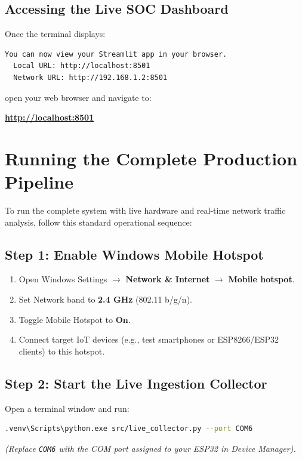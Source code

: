 \documentclass[11pt,a4paper]{article}
\begin{document}
\subsection{Accessing the Live SOC Dashboard}
Once the terminal displays:
\begin{lstlisting}[numbers=none]
  You can now view your Streamlit app in your browser.
  Local URL: http://localhost:8501
  Network URL: http://192.168.1.2:8501
\end{lstlisting}
open your web browser and navigate to:
\begin{center}
\textbf{\url{http://localhost:8501}}
\end{center}

\section{Running the Complete Production Pipeline}

To run the complete system with live hardware and real-time network traffic analysis, follow this standard operational sequence:

\subsection{Step 1: Enable Windows Mobile Hotspot}
\begin{enumerate}[noitemsep]
    \item Open Windows Settings $\rightarrow$ \textbf{Network \& Internet} $\rightarrow$ \textbf{Mobile hotspot}.
    \item Set Network band to \textbf{2.4 GHz} (802.11 b/g/n).
    \item Toggle Mobile Hotspot to \textbf{On}.
    \item Connect target IoT devices (e.g., test smartphones or ESP8266/ESP32 clients) to this hotspot.
\end{enumerate}

\subsection{Step 2: Start the Live Ingestion Collector}
Open a terminal window and run:
\begin{lstlisting}[language=bash, numbers=none]
.venv\Scripts\python.exe src/live_collector.py --port COM6
\end{lstlisting}
\textit{(Replace \texttt{COM6} with the COM port assigned to your ESP32 in Device Manager).}
\end{document}
